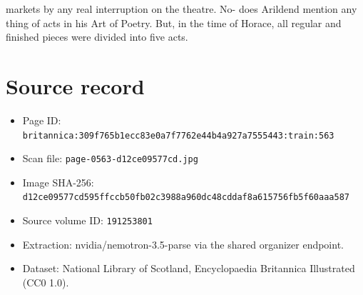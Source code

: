 \documentclass{article}
\begin{document}
markets by any real interruption on the theatre. No- does Arildend mention any thing of acts in his Art of Poetry. But, in the time of Horace, all regular and finished pieces were divided into five acts.

\section*{Source record}
\begin{itemize}
\item Page ID: \texttt{britannica:309f765b1ecc83e0a7f7762e44b4a927a7555443:train:563}
\item Scan file: \texttt{page-0563-d12ce09577cd.jpg}
\item Image SHA-256: \texttt{d12ce09577cd595ffccb50fb02c3988a960dc48cddaf8a615756fb5f60aaa587}
\item Source volume ID: \texttt{191253801}
\item Extraction: nvidia/nemotron-3.5-parse via the shared organizer endpoint.
\item Dataset: National Library of Scotland, Encyclopaedia Britannica Illustrated (CC0 1.0).
\end{itemize}
\end{document}
